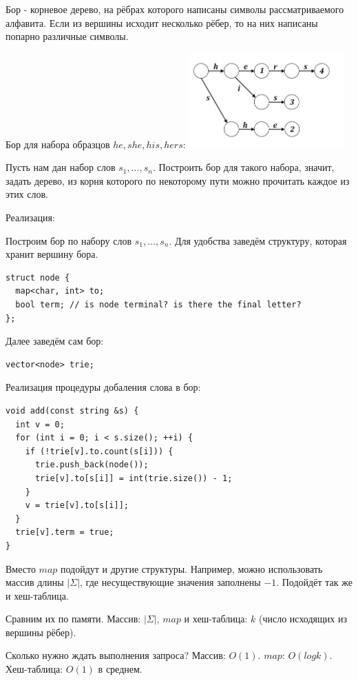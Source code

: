Бор - корневое дерево, на рёбрах которого написаны символы рассматриваемого алфавита. Если из вершины исходит несколько рёбер, то на них написаны попарно различные символы.

Бор для набора образцов ${he,she,his,hers}$:
\includegraphics[width=6cm]{images/Бор.jpg}

Пусть нам дан набор слов $s_1, ..., s_n$. Построить бор для такого набора, значит, задать дерево, из корня которого по некоторому пути можно прочитать каждое из этих слов. 

Реализация: 

Построим бор по набору слов $s_1, \dots, s_n$. Для удобства заведём структуру, которая хранит вершину бора.

\begin{lstlisting}
struct node {
  map<char, int> to;
  bool term; // is node terminal? is there the final letter?
};
\end{lstlisting}

Далее заведём сам бор:

\begin{lstlisting}
vector<node> trie;
\end{lstlisting}

Реализация процедуры добаления слова в бор:

\begin{lstlisting}
void add(const string &s) {
  int v = 0;
  for (int i = 0; i < s.size(); ++i) {
    if (!trie[v].to.count(s[i])) {
      trie.push_back(node());
      trie[v].to[s[i]] = int(trie.size()) - 1;
    }
    v = trie[v].to[s[i]];
  }
  trie[v].term = true;
}
\end{lstlisting}

\Note Вместо $map$ подойдут и другие структуры. Например, можно использовать массив длины $|\Sigma|$, где несуществующие значения заполнены $-1$. Подойдёт так же и хеш-таблица.

Сравним их по памяти. Массив: $|\Sigma|$, $map$ и хеш-таблица: $k$ (число исходящих из вершины рёбер).

Сколько нужно ждать выполнения запроса? Массив: $O(1)$. $map$: $O(log k)$. Хеш-таблица: $O(1)$ в среднем.